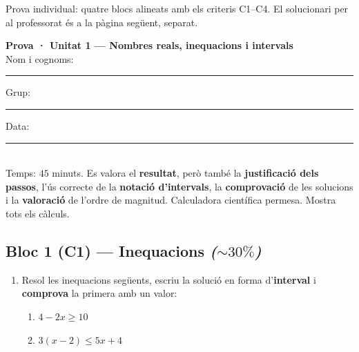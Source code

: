%
{Prova individual: quatre blocs alineats amb els criteris C1–C4. El solucionari per al professorat és a la pàgina següent, separat.}

\begin{tcolorbox}[colback=white, colframe=udnavy, boxrule=0.8pt, arc=2pt,
  left=8pt, right=8pt, top=6pt, bottom=6pt]
\textbf{Prova · Unitat 1 — Nombres reals, inequacions i intervals}\\[4pt]
Nom i cognoms: \rule{6.5cm}{0.4pt} \quad Grup: \rule{1.6cm}{0.4pt} \quad Data: \rule{2.2cm}{0.4pt}\\[6pt]
\small Temps: $45$ minuts. Es valora el \textbf{resultat}, però també la
\textbf{justificació dels passos}, l'ús correcte de la \textbf{notació d'intervals},
la \textbf{comprovació} de les solucions i la \textbf{valoració} de l'ordre de
magnitud. Calculadora científica permesa. Mostra tots els càlculs.
\end{tcolorbox}

\vspace{0.4em}

\subsection*{Bloc 1 (C1) — Inequacions \hfill \normalfont\itshape ($\sim 30\%$)}

\begin{enumerate}[label=\textbf{\arabic*.}, leftmargin=2em, itemsep=8pt]
  \item Resol les inequacions següents, escriu la solució en forma d'\textbf{interval}
        i \textbf{comprova} la primera amb un valor:
    \begin{enumerate}[label=\alph*), leftmargin=1.6em, topsep=2pt]
      \item $4-2x\ge 10$ \hfill \item $3(x-2)\le 5x+4$
    \end{enumerate}
\end{enumerate}


